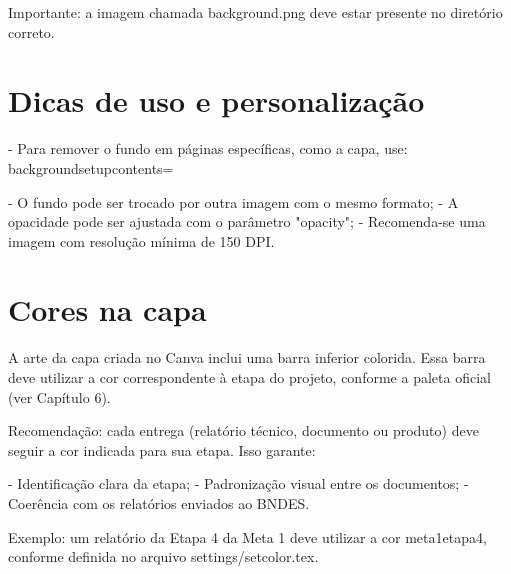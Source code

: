 Importante: a imagem chamada background.png deve estar presente no diretório correto.

\section{Dicas de uso e personalização}

- Para remover o fundo em páginas específicas, como a capa, use:  
backgroundsetup{contents={}}

- O fundo pode ser trocado por outra imagem com o mesmo formato;
- A opacidade pode ser ajustada com o parâmetro "opacity";
- Recomenda-se uma imagem com resolução mínima de 150 DPI.

\section{Cores na capa}

A arte da capa criada no Canva inclui uma barra inferior colorida. Essa barra deve utilizar a cor correspondente à etapa do projeto, conforme a paleta oficial (ver Capítulo 6).

Recomendação: cada entrega (relatório técnico, documento ou produto) deve seguir a cor indicada para sua etapa. Isso garante:

- Identificação clara da etapa;
- Padronização visual entre os documentos;
- Coerência com os relatórios enviados ao BNDES.

Exemplo: um relatório da Etapa 4 da Meta 1 deve utilizar a cor meta1etapa4, conforme definida no arquivo settings/setcolor.tex.
